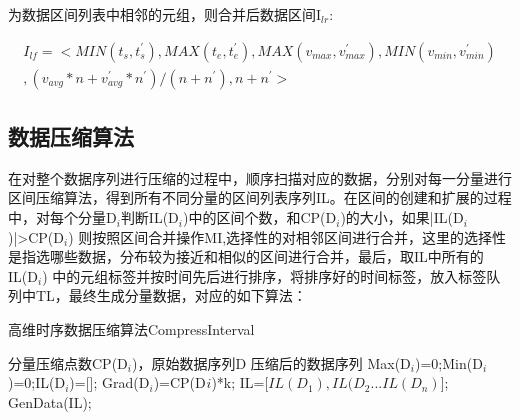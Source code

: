 为数据区间列表中相邻的元组，则合并后数据区间I$_{lr}$:

\begin{equation}
\begin{split}
I_{lf}=<MIN(t_{s},t_{s}^{'}),MAX(t_{e},t_{e}^{'}),MAX(v_{max},v_{max}^{'}),MIN(v_{min},v_{min}^{'})\\
,(v_{avg}*n+v_{avg}^{'}*n^{'})/(n+n^{'}),n+n^{'}>
\end{split}
\end{equation}


\subsection{数据压缩算法}
\label{3.14}
在对整个数据序列进行压缩的过程中，顺序扫描对应的数据，分别对每一分量进行区间压缩算法，得到所有不同分量的区间列表序列IL。在区间的创建和扩展的过程
中，对每个分量D$_{i}$判断IL(D$_{i}$)中的区间个数，和CP(D$_{i}$)的大小，如果|IL(D$_{i}$)|>CP(D$_{i}$)
则按照区间合并操作MI,选择性的对相邻区间进行合并，这里的选择性是指选哪些数据，分布较为接近和相似的区间进行合并，最后，取IL中所有的IL(D$_{i}$)
中的元组标签并按时间先后进行排序，将排序好的时间标签，放入标签队列中TL，最终生成分量数据，对应的如下算法：
\newpage


\begin{algorithm}
\caption{高维时序数据压缩算法CompressInterval}
\label{alg1}
\begin{algorithmic}[1]
\REQUIRE 分量压缩点数CP(D$_{i}$)，原始数据序列D 
\ENSURE 压缩后的数据序列
\STATE Max(D$_{i}$)=0;Min(D$_{i}$)=0;IL(D$_{i}$)=[];
\STATE Grad(D$_{i}$)=CP(D$_{}i$)*k;
\ENDFOR
{}
\ENDWHILE
\STATE IL=[$ IL(D_{1}),IL(D_{2}...IL(D_{n}) $];
\RETURN GenData(IL);
\end{algorithmic}
\end{algorithm}


